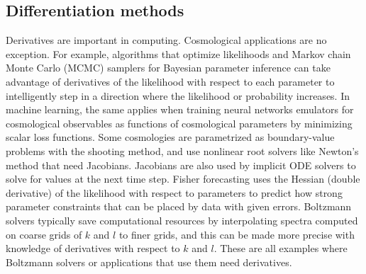 \documentclass{aa}
\begin{document}
\subsection{Differentiation methods}
\label{sec:intro_diff}

Derivatives are important in computing.
Cosmological applications are no exception.
For example, algorithms that optimize likelihoods and Markov chain Monte Carlo (MCMC) samplers for Bayesian parameter inference can take advantage of derivatives of the likelihood with respect to each parameter to intelligently step in a direction where the likelihood or probability increases.
In machine learning, the same applies when training neural networks emulators for cosmological observables as functions of cosmological parameters by minimizing scalar loss functions.
Some cosmologies are parametrized as boundary-value problems with the shooting method, and use nonlinear root solvers like Newton's method that need Jacobians.
Jacobians are also used by implicit ODE solvers to solve for values at the next time step.
Fisher forecasting uses the Hessian (double derivative) of the likelihood with respect to parameters to predict how strong parameter constraints that can be placed by data with given errors.
Boltzmann solvers typically save computational resources by interpolating spectra computed on coarse grids of $k$ and $l$ to finer grids, and this can be made more precise with knowledge of derivatives with respect to $k$ and $l$.
These are all examples where Boltzmann solvers or applications that use them need derivatives.
\end{document}

